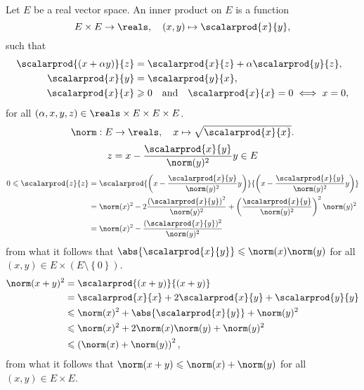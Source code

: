\begin{example}
  Let \(E\) be a real vector space. An inner product on \(E\) is a function
  \[
    E\times{E}\to\reals,\quad(x,y)\mapsto\scalarprod{x}{y},
  \]
  such that
  \begin{align}
    \scalarprod{(x+\alpha{y})}{z} & = \scalarprod{x}{z}+\alpha\scalarprod{y}{z},                   \label{axiom:inner-product-01} \\
    \scalarprod{x}{y}             & = \scalarprod{y}{x},                                           \label{axiom:inner-product-02} \\
    \scalarprod{x}{x}             &   \geqslant{0}\quad\text{and}\quad\scalarprod{x}{x}=0\iff{x=0},\label{axiom:inner-product-03}
  \end{align}
  for all \((\alpha,x,y,z)\in\reals\times{E}\times{E}\times{E}\).
  \[
    \norm:E\to\reals,\quad{x\mapsto{\sqrt{\scalarprod{x}{x}}}}.
  \]
  \begin{equation}
    z=x-\frac{\scalarprod{x}{y}}{\norm(y)^{2}}y\in{E}
  \end{equation}
  \begin{align*}
    0\leqslant\scalarprod{z}{z} & =\scalarprod{\left(x-\frac{\scalarprod{x}{y}}{\norm(y)^{2}}y\right)}{\left(x-\frac{\scalarprod{x}{y}}{\norm(y)^{2}}y\right)}               \\
                                & =\norm(x)^{2}-2\frac{\left(\scalarprod{x}{y}\right)^{2}}{\norm(y)^{2}}+\left(\frac{\scalarprod{x}{y}}{\norm(y)^{2}}\right)^{2}\norm(y)^{2} \\
                                & =\norm(x)^{2}-\frac{(\scalarprod{x}{y})^{2}}{\norm(y)^{2}}
  \end{align*}
  from what it follows that
  \(\abs{\scalarprod{x}{y}}\leqslant\norm(x)\norm(y)\) for all
  \((x,y)\in{E\times{(E\setminus\left\{0\right\})}}\).
  \begin{align*}
    \norm(x+y)^{2} & =\scalarprod{(x+y)}{(x+y)}                                   \\
                   & =\scalarprod{x}{x}+2\scalarprod{x}{y}+\scalarprod{y}{y}      \\
                   & \leqslant{\norm(x)^{2}+\abs{\scalarprod{x}{y}}+\norm(y)^{2}} \\
                   & \leqslant{\norm(x)^{2}+2\norm(x)\norm(y)+\norm(y)^{2}}       \\
                   & \leqslant\left(\norm(x)+\norm(y)\right)^{2},
  \end{align*}
  from what it follows that \(\norm(x+y)\leqslant{\norm(x)+\norm(y)}\) for all
  \((x,y)\in{E\times{E}}\).
\end{example}

